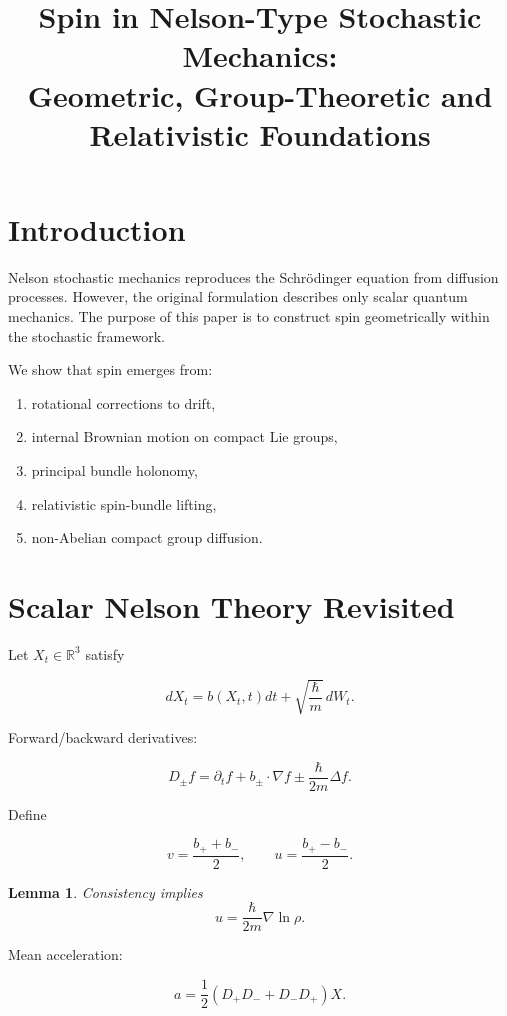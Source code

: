 \documentclass[12pt]{article}
\title{Spin in Nelson-Type Stochastic Mechanics:\\
Geometric, Group-Theoretic and Relativistic Foundations}
\author{}
\date{}
\newtheorem{lemma}{Lemma}
\begin{document}
\maketitle
\tableofcontents

\section{Introduction}

Nelson stochastic mechanics reproduces the Schr\"odinger equation
from diffusion processes. However, the original formulation
describes only scalar quantum mechanics.
The purpose of this paper is to construct spin geometrically
within the stochastic framework.

We show that spin emerges from:

\begin{enumerate}
\item rotational corrections to drift,
\item internal Brownian motion on compact Lie groups,
\item principal bundle holonomy,
\item relativistic spin-bundle lifting,
\item non-Abelian compact group diffusion.
\end{enumerate}

\section{Scalar Nelson Theory Revisited}

Let $X_t \in \mathbb{R}^3$ satisfy

\[
dX_t = b(X_t,t) dt + \sqrt{\frac{\hbar}{m}}\, dW_t.
\]

Forward/backward derivatives:

\[
D_\pm f = \partial_t f + b_\pm\cdot\nabla f
\pm \frac{\hbar}{2m}\Delta f.
\]

Define

\[
v = \frac{b_+ + b_-}{2}, \qquad
u = \frac{b_+ - b_-}{2}.
\]

\begin{lemma}
Consistency implies
\[
u = \frac{\hbar}{2m}\nabla\ln\rho.
\]
\end{lemma}

Mean acceleration:

\[
a = \frac12(D_+D_- + D_-D_+)X.
\]
\end{document}
